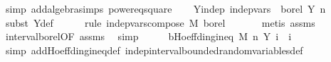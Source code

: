 \begin{isabellebody}
\ {\isacharparenleft}{\kern0pt}simp\ add{\isacharcolon}{\kern0pt}algebra{\isacharunderscore}{\kern0pt}simps\ power{}{\isacharunderscore}{\kern0pt}eq{\isacharunderscore}{\kern0pt}square{\isacharparenright}{\kern0pt}\isanewline
\isanewline
\ \ \isamarkupfalse%
\ Y{\isacharunderscore}{\kern0pt}indep{\isacharcolon}{\kern0pt}\ {\isachardoublequoteopen}indep{\isacharunderscore}{\kern0pt}vars\ {\isacharparenleft}{\kern0pt}{\isasymlambda}{\isacharunderscore}{\kern0pt}{\isachardot}{\kern0pt}\ borel{\isacharparenright}{\kern0pt}\ Y\ {\isacharbraceleft}{\kern0pt}{}{\isachardot}{\kern0pt}{\isachardot}{\kern0pt}{\isacharless}{\kern0pt}n{\isacharbraceright}{\kern0pt}{\isachardoublequoteclose}\isanewline
\ \ \ \ \isamarkupfalse%
\ {\isacharparenleft}{\kern0pt}subst\ Y{\isacharunderscore}{\kern0pt}def{\isacharparenright}{\kern0pt}\isanewline
\ \ \ \ \isamarkupfalse%
\ {\isacharparenleft}{\kern0pt}rule\ indep{\isacharunderscore}{\kern0pt}vars{\isacharunderscore}{\kern0pt}compose{\isacharbrackleft}{\kern0pt}\ M{\isacharprime}{\kern0pt}{\isacharequal}{\kern0pt}{\isachardoublequoteopen}{\isacharparenleft}{\kern0pt}{\isasymlambda}{\isacharunderscore}{\kern0pt}{\isachardot}{\kern0pt}\ borel{\isacharparenright}{\kern0pt}{\isachardoublequoteclose}{\isacharbrackright}{\kern0pt}{\isacharparenright}{\kern0pt}\isanewline
\ \ \ \ \ \isamarkupfalse%
\ {\isacharparenleft}{\kern0pt}metis\ assms{\isacharparenleft}{\kern0pt}{}{\isacharparenright}{\kern0pt}{\isacharparenright}{\kern0pt}\isanewline
\ \ \ \ \isamarkupfalse%
\ interval{\isacharunderscore}{\kern0pt}borel{\isacharbrackleft}{\kern0pt}OF\ assms{\isacharparenleft}{\kern0pt}{}{\isacharparenright}{\kern0pt}{\isacharbrackright}{\kern0pt}\ \isamarkupfalse%
\ simp\isanewline
\ \isanewline
\ \ \isamarkupfalse%
\ b{\isacharcolon}{\kern0pt}{\isachardoublequoteopen}Hoeffding{\isacharunderscore}{\kern0pt}ineq\ M\ {\isacharbraceleft}{\kern0pt}{}{\isachardot}{\kern0pt}{\isachardot}{\kern0pt}{\isacharless}{\kern0pt}n{\isacharbraceright}{\kern0pt}\ Y\ {\isacharparenleft}{\kern0pt}{\isasymlambda}i{\isachardot}{\kern0pt}\ {}{\isacharparenright}{\kern0pt}\ {\isacharparenleft}{\kern0pt}{\isasymlambda}i{\isachardot}{\kern0pt}\ {}{\isacharparenright}{\kern0pt}{\isachardoublequoteclose}\ \isanewline
\ \ \ \ \isamarkupfalse%
\ {\isacharparenleft}{\kern0pt}simp\ add{\isacharcolon}{\kern0pt}Hoeffding{\isacharunderscore}{\kern0pt}ineq{\isacharunderscore}{\kern0pt}def\ indep{\isacharunderscore}{\kern0pt}interval{\isacharunderscore}{\kern0pt}bounded{\isacharunderscore}{\kern0pt}random{\isacharunderscore}{\kern0pt}variables{\isacharunderscore}{\kern0pt}def{\isacharparenright}{\kern0pt}\isanewline

\end{isabellebody}
